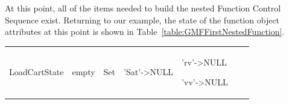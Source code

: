 At this point, all of the items needed to build the nested Function Control Sequence exist. 
Returning to our example, the state of the function object attributes at this point is shown in
Table~\ref{table:GMFFirstNestedFunction}.

\begin{center}
\tablehead{
}
\tabletail{
}
\tablelasttail{\hline}
\begin{supertabular}{|p{0.9in}|p{0.7in}|p{0.7in}|p{0.75in}|p{0.75in}|p{0.8in}|p{0.7in}|}
\hline
\begin{small}LoadCartState\end{small} &
\begin{small}empty\end{small} &
\begin{small}Set\end{small} &
\begin{small}'Sat'->NULL\end{small} &
\begin{small}'rv'->NULL

'vv'->NULL


\end{small}
\end{supertabular}
\end{center}
